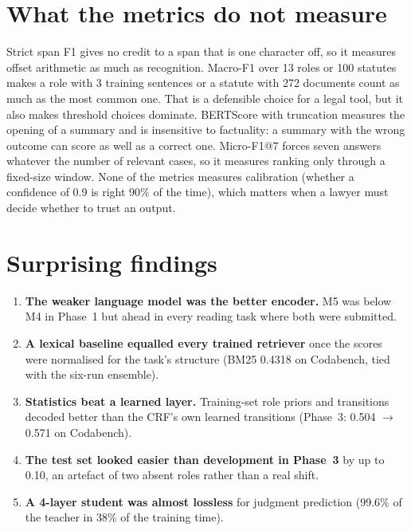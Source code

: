 \documentclass[11pt, oneside]{article}
\begin{document}
\section{What the metrics do not measure}
Strict span F1 gives no credit to a span that is one character off, so it measures offset arithmetic as much as
recognition. Macro-F1 over 13 roles or 100 statutes makes a role with 3 training sentences or a statute with 272
documents count as much as the most common one. That is a defensible choice for a legal tool, but it also makes
threshold choices dominate. BERTScore with truncation measures the opening of a summary and is insensitive to
factuality: a summary with the wrong outcome can score as well as a correct one. Micro-F1@7 forces seven answers
whatever the number of relevant cases, so it measures ranking only through a fixed-size window. None of the metrics
measures calibration (whether a confidence of 0.9 is right 90\% of the time), which matters when a lawyer must decide
whether to trust an output.

\section{Surprising findings}
\begin{enumerate}[leftmargin=*, itemsep=2pt]
\item \textbf{The weaker language model was the better encoder.} M5 was below M4 in Phase~1 but ahead in every reading
task where both were submitted.
\item \textbf{A lexical baseline equalled every trained retriever} once the scores were normalised for the task's
structure (BM25 0.4318 on Codabench, tied with the six-run ensemble).
\item \textbf{Statistics beat a learned layer.} Training-set role priors and transitions decoded better than the CRF's
own learned transitions (Phase~3: 0.504 $\to$ 0.571 on Codabench).
\item \textbf{The test set looked easier than development in Phase~3} by up to 0.10, an artefact of two absent roles
rather than a real shift.
\item \textbf{A 4-layer student was almost lossless} for judgment prediction (99.6\% of the teacher in 38\% of the
training time).
\end{enumerate}
\end{document}
